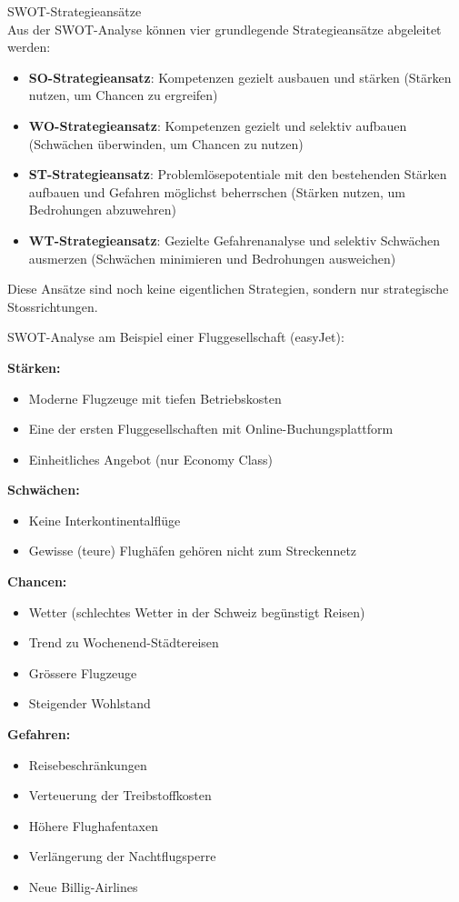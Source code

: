 \begin{concept}{SWOT-Strategieansätze}\\
Aus der SWOT-Analyse können vier grundlegende Strategieansätze abgeleitet werden:
\begin{itemize}
    \item \textbf{SO-Strategieansatz}: Kompetenzen gezielt ausbauen und stärken (Stärken nutzen, um Chancen zu ergreifen)
    \item \textbf{WO-Strategieansatz}: Kompetenzen gezielt und selektiv aufbauen (Schwächen überwinden, um Chancen zu nutzen)
    \item \textbf{ST-Strategieansatz}: Problemlösepotentiale mit den bestehenden Stärken aufbauen und Gefahren möglichst beherrschen (Stärken nutzen, um Bedrohungen abzuwehren)
    \item \textbf{WT-Strategieansatz}: Gezielte Gefahrenanalyse und selektiv Schwächen ausmerzen (Schwächen minimieren und Bedrohungen ausweichen)
\end{itemize}

 Diese Ansätze sind noch keine eigentlichen Strategien, sondern nur strategische Stossrichtungen.
\end{concept}

\begin{example}
SWOT-Analyse am Beispiel einer Fluggesellschaft (easyJet):

\textbf{Stärken:}
\begin{itemize}
    \item Moderne Flugzeuge mit tiefen Betriebskosten
    \item Eine der ersten Fluggesellschaften mit Online-Buchungsplattform
    \item Einheitliches Angebot (nur Economy Class)
\end{itemize}

\textbf{Schwächen:}
\begin{itemize}
    \item Keine Interkontinentalflüge
    \item Gewisse (teure) Flughäfen gehören nicht zum Streckennetz
\end{itemize}

\textbf{Chancen:}
\begin{itemize}
    \item Wetter (schlechtes Wetter in der Schweiz begünstigt Reisen)
    \item Trend zu Wochenend-Städtereisen
    \item Grössere Flugzeuge
    \item Steigender Wohlstand
\end{itemize}

\textbf{Gefahren:}
\begin{itemize}
    \item Reisebeschränkungen
    \item Verteuerung der Treibstoffkosten
    \item Höhere Flughafentaxen
    \item Verlängerung der Nachtflugsperre
    \item Neue Billig-Airlines
\end{itemize}
\end{example}

